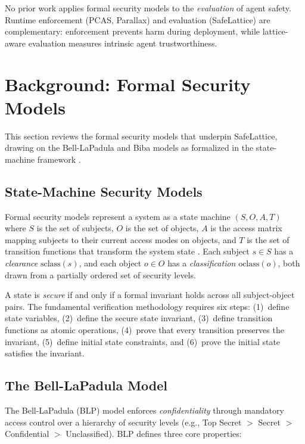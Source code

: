 \documentclass[manuscript,screen,review,anonymous]{acmart}
\begin{document}
No prior work applies formal security models to the \textit{evaluation} of agent safety. Runtime enforcement (PCAS, Parallax) and evaluation (SafeLattice) are complementary: enforcement prevents harm during deployment, while lattice-aware evaluation measures intrinsic agent trustworthiness.

\section{Background: Formal Security Models}
\label{sec:background}

This section reviews the formal security models that underpin SafeLattice, drawing on the Bell-LaPadula and Biba models as formalized in the state-machine framework \cite{belllapadula1976, biba1977}.

\subsection{State-Machine Security Models}

Formal security models represent a system as a state machine $(S, O, A, T)$ where $S$ is the set of subjects, $O$ is the set of objects, $A$ is the access matrix mapping subjects to their current access modes on objects, and $T$ is the set of transition functions that transform the system state \cite{belllapadula1976}. Each subject $s \in S$ has a \textit{clearance} $\text{sclass}(s)$, and each object $o \in O$ has a \textit{classification} $\text{oclass}(o)$, both drawn from a partially ordered set of security levels.

A state is \textit{secure} if and only if a formal invariant holds across all subject-object pairs. The fundamental verification methodology requires six steps: (1)~define state variables, (2)~define the secure state invariant, (3)~define transition functions as atomic operations, (4)~prove that every transition preserves the invariant, (5)~define initial state constraints, and (6)~prove the initial state satisfies the invariant.

\subsection{The Bell-LaPadula Model}

The Bell-LaPadula (BLP) model \cite{belllapadula1976} enforces \textit{confidentiality} through mandatory access control over a hierarchy of security levels (e.g., Top Secret $>$ Secret $>$ Confidential $>$ Unclassified). BLP defines three core properties:
\end{document}
